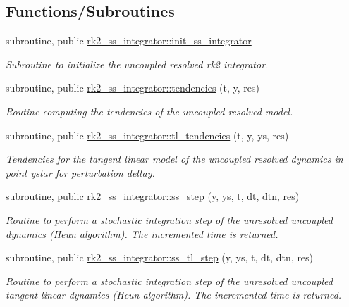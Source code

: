 \subsection*{Functions/\+Subroutines}
\begin{DoxyCompactItemize}
\item 
subroutine, public \hyperlink{namespacerk2__ss__integrator_a6e5a498fbe46f8d573aa3af2cb3dd39c}{rk2\+\_\+ss\+\_\+integrator\+::init\+\_\+ss\+\_\+integrator}
\begin{DoxyCompactList}\small\item\em Subroutine to initialize the uncoupled resolved rk2 integrator. \end{DoxyCompactList}\item 
subroutine, public \hyperlink{namespacerk2__ss__integrator_aebdbf0093b784435a35ecb8ef7e8bcaa}{rk2\+\_\+ss\+\_\+integrator\+::tendencies} (t, y, res)
\begin{DoxyCompactList}\small\item\em Routine computing the tendencies of the uncoupled resolved model. \end{DoxyCompactList}\item 
subroutine, public \hyperlink{namespacerk2__ss__integrator_aa89ab291aa152abdbf23c3d6820c2156}{rk2\+\_\+ss\+\_\+integrator\+::tl\+\_\+tendencies} (t, y, ys, res)
\begin{DoxyCompactList}\small\item\em Tendencies for the tangent linear model of the uncoupled resolved dynamics in point ystar for perturbation deltay. \end{DoxyCompactList}\item 
subroutine, public \hyperlink{namespacerk2__ss__integrator_a54ac83fe046cde7379bd09f7415f5708}{rk2\+\_\+ss\+\_\+integrator\+::ss\+\_\+step} (y, ys, t, dt, dtn, res)
\begin{DoxyCompactList}\small\item\em Routine to perform a stochastic integration step of the unresolved uncoupled dynamics (Heun algorithm). The incremented time is returned. \end{DoxyCompactList}\item 
subroutine, public \hyperlink{namespacerk2__ss__integrator_af5eb1776d98c24b82be878c59b978b22}{rk2\+\_\+ss\+\_\+integrator\+::ss\+\_\+tl\+\_\+step} (y, ys, t, dt, dtn, res)
\begin{DoxyCompactList}\small\item\em Routine to perform a stochastic integration step of the unresolved uncoupled tangent linear dynamics (Heun algorithm). The incremented time is returned. \end{DoxyCompactList}\end{DoxyCompactItemize}

